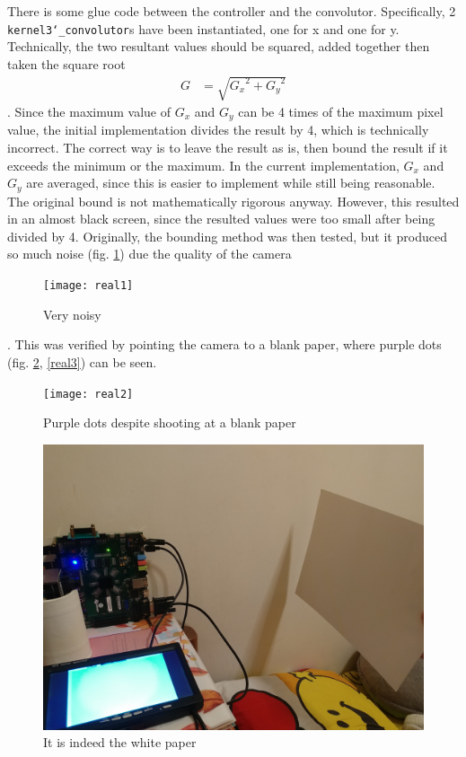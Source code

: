 \documentclass{IEEEtran}
\begin{document}
	There is some glue code between the controller and the convolutor. Specifically, 2 \texttt{kernel3\char`_convolutor}s have been instantiated, one for x and one for y. Technically, the two resultant values should be squared, added together then taken the square root
	\begin{align*}
		G&=\sqrt{{G_x}^2+{G_y}^2}
	\end{align*}
	. Since the maximum value of $G_x$ and $G_y$ can be 4 times of the maximum pixel value, the initial implementation divides the result by 4, which is technically incorrect. The correct way is to leave the result as is, then bound the result if it exceeds the minimum or the maximum. In the current implementation, $G_x$ and $G_y$ are averaged, since this is easier to implement while still being reasonable. The original bound is not mathematically rigorous anyway. However, this resulted in an almost black screen, since the resulted values were too small after being divided by 4. Originally, the bounding method was then tested, but it produced so much noise (fig. \ref{fig:real1}) due the quality of the camera\begin{figure}[h]
		\centering
		\texttt{[image: real1]}
		\caption{Very noisy}
		\label{fig:real1}
	\end{figure}. This was verified by pointing the camera to a blank paper, where purple dots (fig. \ref{fig:real2}, \ref{real3}) can be seen.
\begin{figure}[h]
		\centering
		\texttt{[image: real2]}
		\caption{Purple dots despite shooting at a blank paper}
		\label{fig:real2}
	\end{figure}
\begin{figure}[h]
		\centering
		\includegraphics[scale=0.052]{real3}
		\caption{It is indeed the white paper}
		\label{fig:real3}
	\end{figure}
\end{document}
